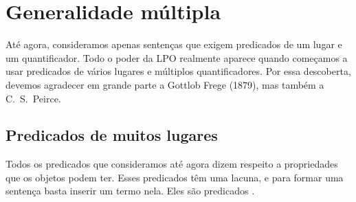 
\chapter{Generalidade múltipla}\label{s:MultipleGenerality}
Até agora, consideramos apenas sentenças que exigem predicados de um lugar e um quantificador. Todo o poder da LPO realmente aparece quando começamos a usar predicados de vários lugares e múltiplos quantificadores. Por essa descoberta, devemos agradecer em grande parte a \foreignlanguage{german}{Gottlob Frege} (1879), mas também a C.~S.~Peirce.


\section{Predicados de muitos lugares}
Todos os predicados que consideramos até agora dizem respeito a propriedades que os objetos podem ter. Esses predicados têm uma lacuna, e para formar uma sentença basta inserir um termo nela. Eles são predicados .

